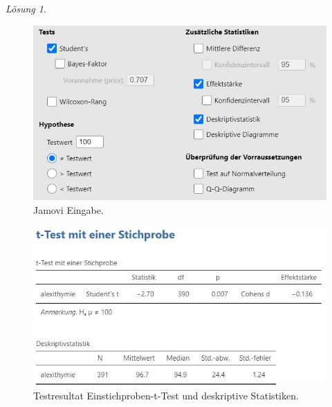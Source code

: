 \documentclass[
]{book}
\theoremstyle{definition}
\theoremstyle{definition}
\theoremstyle{definition}
\theoremstyle{definition}
\theoremstyle{remark}
\newtheorem*{solution}{Lösung}
\begin{document}
\begin{solution}
\leavevmode

\begin{figure}

{\centering \includegraphics[width=1\linewidth]{figures/05-exr-alexithymie-jmv-input} 

}

\caption{Jamovi Eingabe.}\label{fig:sol-alexithymie-input}
\end{figure}

\begin{figure}

{\centering \includegraphics[width=1\linewidth]{figures/05-exr-alexithymie-jmv-output} 

}

\caption{Testresultat Einstichproben-t-Test und deskriptive Statistiken.}\label{fig:sol-alexithymie-output}
\end{figure}

\end{solution}
\end{document}

